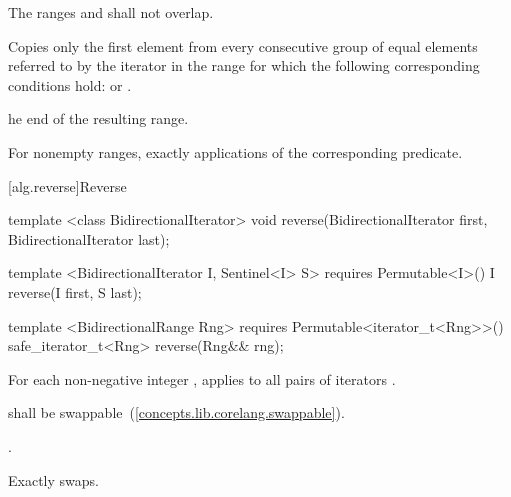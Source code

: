 \begin{itemdescr}
\pnum
\requires
{}
The ranges
and
shall not overlap.

\pnum
\effects
Copies only the first element from every consecutive group of equal elements referred to by
the iterator
in the range
for which the following corresponding conditions hold:
or
.

\pnum
\returns
{}he end of the resulting range.

\pnum
\complexity
For nonempty ranges, exactly
applications of the corresponding predicate.
\end{itemdescr}

[alg.reverse]{Reverse}

%
\begin{removedblock}
\begin{itemdecl}
template <class BidirectionalIterator>
  void reverse(BidirectionalIterator first, BidirectionalIterator last);
\end{itemdecl}
\end{removedblock}
\begin{addedblock}
\begin{itemdecl}
template <BidirectionalIterator I, Sentinel<I> S>
  requires Permutable<I>()
  I reverse(I first, S last);

template <BidirectionalRange Rng>
  requires Permutable<iterator_t<Rng>>()
  safe_iterator_t<Rng>
    reverse(Rng&& rng);
\end{itemdecl}
\end{addedblock}

\begin{itemdescr}
\pnum
\effects
For each non-negative integer
,
applies
to all pairs of iterators
.

\begin{removedblock}
\pnum
\requires
{} shall be swappable~(\ref{concepts.lib.corelang.swappable}).
\end{removedblock}

\begin{addedblock}
\pnum
\returns {}.
\end{addedblock}

\pnum
\complexity
Exactly
swaps.
\end{itemdescr}

